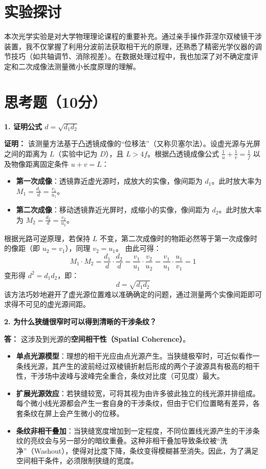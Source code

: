\documentclass[]{../template/Report}%
\begin{document}
\begin{fullreportonly}
\section{实验探讨}
本次光学实验是对大学物理理论课程的重要补充。通过亲手操作菲涅尔双棱镜干涉装置，我不仅掌握了利用分波前法获取相干光的原理，还熟悉了精密光学仪器的调节技巧（如共轴调节、消除视差）。在数据处理过程中，我也加深了对不确定度评定和二次成像法测量微小长度原理的理解。


\section{思考题（10分）}

\textbf{1. 证明公式 $d = \sqrt{d_1 d_2}$}

\noindent\textbf{证明：} 
该测量方法基于凸透镜成像的“位移法”（又称贝塞尔法）。设虚光源与光屏之间的距离为 $L$（实验中记为 $D$），且 $L > 4f$。根据凸透镜成像公式 $\frac{1}{u} + \frac{1}{v} = \frac{1}{f}$ 以及物像距离固定条件 $u + v = L$：
\begin{itemize}
    \item \textbf{第一次成像}：透镜靠近虚光源时，成放大的实像，像间距为 $d_1$。此时放大率为 $M_1 = \frac{d_1}{d} = \frac{v_1}{u_1}$。
    \item \textbf{第二次成像}：移动透镜靠近光屏时，成缩小的实像，像间距为 $d_2$。此时放大率为 $M_2 = \frac{d_2}{d} = \frac{v_2}{u_2}$。
\end{itemize}
根据光路可逆原理，若保持 $L$ 不变，第二次成像时的物距必然等于第一次成像时的像距（即 $u_2 = v_1$），同理 $v_2 = u_1$。
由此可得：
\[
M_1 \cdot M_2 = \frac{d_1}{d} \cdot \frac{d_2}{d} = \frac{v_1}{u_1} \cdot \frac{v_2}{u_2} = \frac{v_1}{u_1} \cdot \frac{u_1}{v_1} = 1
\]
变形得 $d^2 = d_1 d_2$，即：
\[
d = \sqrt{d_1 d_2}
\]
该方法巧妙地避开了虚光源位置难以准确确定的问题，通过测量两个实像间距即可求得不可见的虚光源间距。

\medskip
\textbf{2. 为什么狭缝很窄时可以得到清晰的干涉条纹？}

\noindent\textbf{答：} 这涉及到光源的\textbf{空间相干性（Spatial Coherence）}。
\begin{itemize}
    \item \textbf{单点光源模型}：理想的相干光应由点光源产生。当狭缝极窄时，可近似看作一条线光源，其产生的波前经过双棱镜折射后形成的两个子波源具有极高的相干性，干涉场中波峰与波峰完全重合，条纹对比度（可见度）最大。
    \item \textbf{扩展光源效应}：若狭缝较宽，可将其视为由许多彼此独立的线光源并排组成。每个微小线光源都会产生一套自身的干涉条纹，但由于它们位置略有差异，各套条纹在屏上会产生微小的位移。
    \item \textbf{条纹非相干叠加}：当狭缝宽度增加到一定程度，不同位置线光源产生的干涉条纹的亮纹会与另一部分的暗纹重叠。这种非相干叠加导致条纹被“洗净”（Washout），使得对比度下降，条纹变得模糊甚至消失。因此，为了满足空间相干条件，必须限制狭缝的宽度。
\end{itemize}


\end{fullreportonly}
\end{document}
